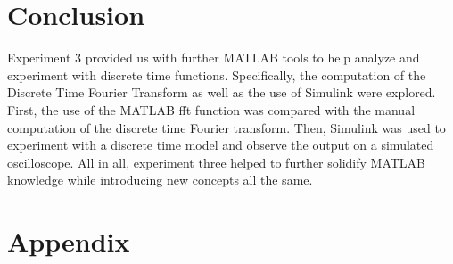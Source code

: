 \documentclass{article}
\begin{document}
\section{Conclusion}

Experiment 3 provided us with further MATLAB tools to help analyze and experiment with discrete time functions. Specifically, the computation of the Discrete Time Fourier Transform as well as the use of Simulink were explored. First, the use of the MATLAB fft function was compared with the manual computation of the discrete time Fourier transform. Then, Simulink was used to experiment with a discrete time model and observe the output on a simulated oscilloscope. All in all, experiment three helped to further solidify MATLAB knowledge while introducing new concepts all the same.

\newpage
\section{Appendix}
\end{document}
